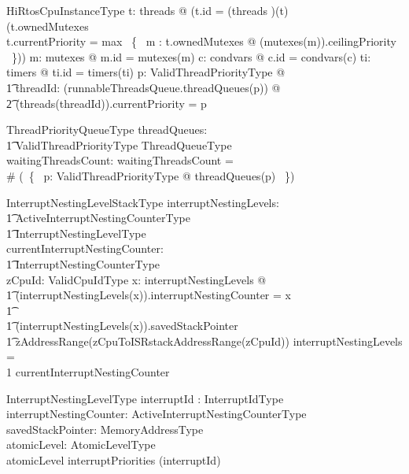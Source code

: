 \documentclass[11pt,letterpaper,twoside,openany]{book}
\begin{document}
\begin{schema}{HiRtosCpuInstanceType}
\also
    \forall t: \ran threads @ (t.id = (threads \inv)(t) \land \\
    (t.ownedMutexes \neq \emptyset \implies \\
     t.currentPriority = max~ \{~ m : \ran t.ownedMutexes @ (mutexes(m)).ceilingPriority ~\}))
\also
    \forall m: \ran mutexes @ m.id = mutexes\inv(m)
\also
    \forall c: \ran condvars @  c.id = condvars\inv(c)
\also
    \forall ti: \ran timers @ ti.id = timers\inv(ti)
\also
    \forall p: ValidThreadPriorityType @ \\
\t1    \forall threadId: \ran (runnableThreadsQueue.threadQueues(p)) @ \\
\t2    (threads(threadId)).currentPriority = p
\end{schema}

\begin{schema}{ThreadPriorityQueueType}
    threadQueues: \\
    \t1 ValidThreadPriorityType \inj ThreadQueueType \\
    waitingThreadsCount: \nat
\where
   waitingThreadsCount = \\
   \# (\bigcup ~\{~ p: ValidThreadPriorityType @ threadQueues(p) ~\})
\end{schema}

\begin{schema}{InterruptNestingLevelStackType}
       interruptNestingLevels: \\
    \t1 ActiveInterruptNestingCounterType \inj \\
    \t1 InterruptNestingLevelType \\
    currentInterruptNestingCounter: \\
    \t1 InterruptNestingCounterType \\
    zCpuId: ValidCpuIdType
\where
   \forall x: \dom interruptNestingLevels @ \\
\t1   (interruptNestingLevels(x)).interruptNestingCounter = x \\
\t1   \land \\
\t1   (interruptNestingLevels(x)).savedStackPointer \in \\
\t1        zAddressRange(zCpuToISRstackAddressRange(zCpuId))
\also
   \dom interruptNestingLevels = \\
   1 \upto currentInterruptNestingCounter
\end{schema}

\begin{schema}{InterruptNestingLevelType}
   interruptId : InterruptIdType \\
   interruptNestingCounter: ActiveInterruptNestingCounterType \\
   savedStackPointer: MemoryAddressType \\
   atomicLevel: AtomicLevelType \\
\where
   atomicLevel \leq interruptPriorities (interruptId)
\also

\end{schema}
\end{document}
